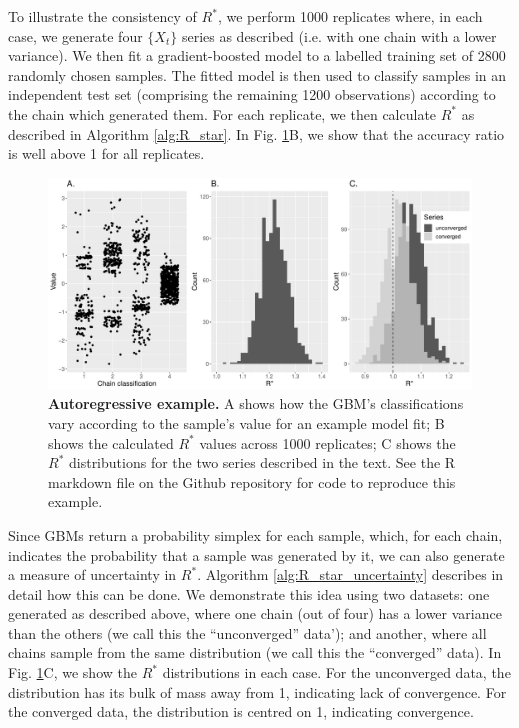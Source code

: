 \documentclass{article}
\begin{document}
To illustrate the consistency of $R^*$, we perform 1000 replicates where, in each case, we generate four $\{X_t\}$ series as described (i.e. with one chain with a lower variance). We then fit a gradient-boosted model to a labelled training set of 2800 randomly chosen samples. The fitted model is then used to classify samples in an independent test set (comprising the remaining 1200 observations) according to the chain which generated them. For each replicate, we then calculate $R^*$ as described in Algorithm \ref{alg:R_star}. In Fig. \ref{fig:ar1}B, we show that the accuracy ratio is well above 1 for all replicates.

\begin{figure}[h]
	\centerline{\includegraphics[width=1.0\textwidth]{../output/ar1.pdf}}
	\caption{\textbf{Autoregressive example.} A shows how the GBM's classifications vary according to the sample's value for an example model fit; B shows the calculated $R^*$ values across 1000 replicates; C shows the $R^*$ distributions for the two series described in the text. See the R markdown file on the Github repository for code to reproduce this example.}
	\label{fig:ar1}
\end{figure}

Since GBMs return a probability simplex for each sample, which, for each chain, indicates the probability that a sample was generated by it, we can also generate a measure of uncertainty in $R^*$. Algorithm \ref{alg:R_star_uncertainty} describes in detail how this can be done. We demonstrate this idea using two datasets: one generated as described above, where one chain (out of four) has a lower variance than the others (we call this the ``unconverged'' data'); and another, where all chains sample from the same distribution (we call this the ``converged'' data). In Fig. \ref{fig:ar1}C, we show the $R^*$ distributions in each case. For the unconverged data, the distribution has its bulk of mass away from 1, indicating lack of convergence. For the converged data, the distribution is centred on 1, indicating convergence. 
\end{document}
